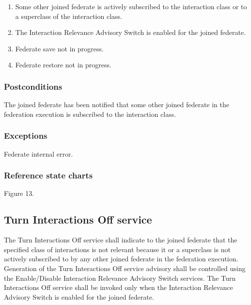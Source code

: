 \clearpage

\begin{compactstdpage}
    \begin{enumerate}[label=\alph*),leftmargin=2.35em,itemsep=1pt,topsep=3pt,parsep=0pt,start=4]
\item Some other joined federate is actively subscribed to the interaction class or to a superclass of the interaction class.
\item The Interaction Relevance Advisory Switch is enabled for the joined federate.
\item Federate save not in progress.
\item Federate restore not in progress.
    \end{enumerate}

    \subsubsection{Postconditions}
    \begin{stdalphalist}
        \item The joined federate has been notified that some other joined federate in the federation execution is subscribed to the interaction class.
    \end{stdalphalist}

    \subsubsection{Exceptions}
    \begin{stdalphalist}
        \item Federate internal error.
    \end{stdalphalist}

    \subsubsection{Reference state charts}
    \begin{stdalphalist}
        \item Figure 13.
    \end{stdalphalist}

    \subsection{Turn Interactions Off \rtiinitiated{} service}

    The Turn Interactions Off \rtiinitiated{} service shall indicate to the joined federate that the specified class of interactions is not relevant because it or a superclass is not actively subscribed to by any other joined federate in the federation execution. Generation of the Turn Interactions Off \rtiinitiated{} service advisory shall be controlled using the Enable/Disable Interaction Relevance Advisory Switch services. The Turn Interactions Off \rtiinitiated{} service shall be invoked only when the Interaction Relevance Advisory Switch is enabled for the joined federate.


\end{compactstdpage}
